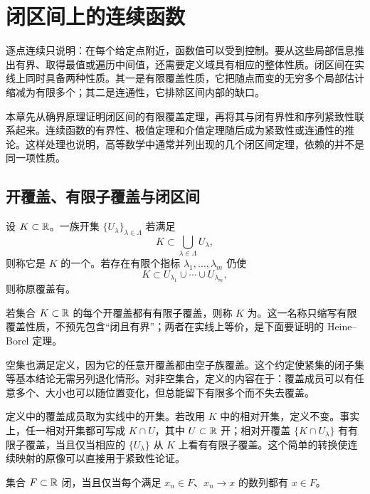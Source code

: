 \chapter{闭区间上的连续函数}
\label{chap:continuous-functions-closed-interval}
\label{chap:compact-connected-real-line}


逐点连续只说明：在每个给定点附近，函数值可以受到控制。要从这些局部信息推出有界、取得最值或遍历中间值，还需要定义域具有相应的整体性质。闭区间在实线上同时具备两种性质。其一是有限覆盖性质，它把随点而变的无穷多个局部估计缩减为有限多个；其二是连通性，它排除区间内部的缺口。

本章先从确界原理证明闭区间的有限覆盖定理，再将其与闭有界性和序列紧致性联系起来。连续函数的有界性、极值定理和介值定理随后成为紧致性或连通性的推论。这样处理也说明，高等数学中通常并列出现的几个闭区间定理，依赖的并不是同一项性质。


\section{开覆盖、有限子覆盖与闭区间}

\begin{definition}[开覆盖]
设 \(K\subset\mathbb{R}\)。一族开集 \(\{U_\lambda\}_{\lambda\in\Lambda}\) 若满足
\[
 K\subset\bigcup_{\lambda\in\Lambda}U_\lambda,
\]
则称它是 \(K\) 的一个。若存在有限个指标 \(\lambda_1,\ldots,\lambda_m\) 仍使
\[
 K\subset U_{\lambda_1}\cup\cdots\cup U_{\lambda_m},
\]
则称原覆盖有。
\end{definition}

\begin{definition}[紧集]
若集合 \(K\subset\mathbb{R}\) 的每个开覆盖都有有限子覆盖，则称 \(K\) 为。这一名称只缩写有限覆盖性质，不预先包含“闭且有界”；两者在实线上等价，是下面要证明的 Heine--Borel 定理。
\end{definition}

空集也满足定义，因为它的任意开覆盖都由空子族覆盖。这个约定使紧集的闭子集等基本结论无需另列退化情形。对非空集合，定义的内容在于：覆盖成员可以有任意多个、大小也可以随位置变化，但总能留下有限多个而不失去覆盖。

定义中的覆盖成员取为实线中的开集。若改用 \(K\) 中的相对开集，定义不变。事实上，任一相对开集都可写成 \(K\cap U\)，其中 \(U\subset\mathbb{R}\) 开；相对开覆盖
\(\{K\cap U_\lambda\}\) 有有限子覆盖，当且仅当相应的 \(\{U_\lambda\}\) 从 \(K\) 上看有有限子覆盖。这个简单的转换使连续映射的原像可以直接用于紧致性论证。

\begin{proposition}[闭集的序列刻画]
集合 \(F\subset\mathbb{R}\) 闭，当且仅当每个满足 \(x_n\in F\)、\(x_n\to x\) 的数列都有 \(x\in F\)。
\end{proposition}

